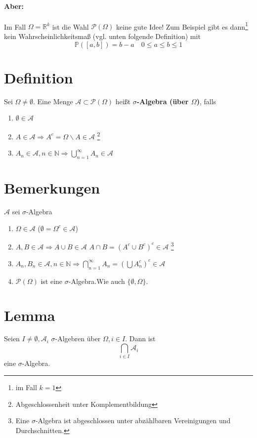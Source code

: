 \documentclass[a4paper,11pt,notitlepage]{report}
\newcommand{\R}{{\ensuremath{\mathbb{R}}}}
\newcommand{\N}{{\ensuremath{\mathbb{N}}}}
\newcommand{\Prim}{{\ensuremath{\mathbb{P}}}}
\begin{document}
\paragraph{Aber:} Im Fall $\Omega = \R^k$ ist die Wahl $\mathcal{P}(\Omega)$ keine gute Idee! Zum Beispiel gibt es dann\footnote{im Fall $k=1$} kein Wahrscheinlichkeitsmaß (vgl. unten folgende Definition) mit
$$\Prim([a,b]) = b - a \quad 0 \leq a \leq b \leq 1$$

\section{Definition}
Sei $\Omega \neq \emptyset$. Eine Menge $\mathcal{A} \subset \mathcal{P}(\Omega)$ heißt \textbf{$\sigma$-Algebra (über $\Omega$)}, falls
\begin{enumerate}
	\item $\emptyset \in \mathcal{A}$
	\item $A \in \mathcal{A} \Rightarrow A^c = \Omega \backslash A \in \mathcal{A}$ \footnote{Abgeschlossenheit unter Komplementbildung}
	\item $A_n \in \mathcal{A}, n \in \N \Rightarrow \bigcup\limits_{n=1}^{\infty}{A_n \in \mathcal{A}}$
\end{enumerate}

\section{Bemerkungen}
$\mathcal{A}$ sei $\sigma$-Algebra
\begin{enumerate}
	\item $\Omega \in \mathcal{A}$ ($\emptyset = \Omega^c \in \mathcal{A}$)
	\item $A,B \in \mathcal{A} \Rightarrow A \cup B \in \mathcal{A}$
		\newline
		$A \cap B = (A^c \cup B^c)^c \in \mathcal{A}$ \footnote{Eine $\sigma$-Algebra ist abgeschlossen unter abzählbaren Vereinigungen und Durchschnitten.}
	\item $A_n, B_n \in \mathcal{A}, n \in \N \Rightarrow \bigcap\limits_{n=1}^{\infty}{A_n} = (\bigcup A_n^c)^c \in \mathcal{A}$
	\item $\mathcal{P}(\Omega)$ ist eine $\sigma$-Algebra.\newline Wie auch $\{\emptyset, \Omega\}$. 
\end{enumerate}

\section{Lemma}
Seien $I \neq \emptyset, \mathcal{A}_i$ $\sigma$-Algebren über $\Omega, i \in I.$ \newline
Dann ist
$$\bigcap\limits_{i \in I}{\mathcal{A}_i}$$ eine $\sigma$-Algebra.
\end{document}
